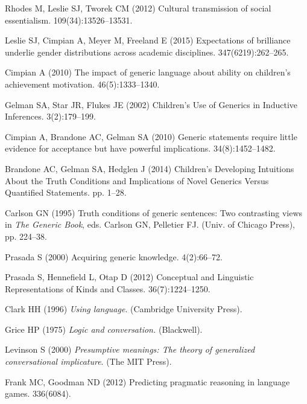 \documentclass{pnastwo}
\begin{document}
\begin{article}
\begin{thebibliography}{10}
Rhodes M, Leslie SJ, Tworek CM (2012) {Cultural transmission of social
  essentialism}.
  109(34):13526--13531.

Leslie SJ, Cimpian A, Meyer M, Freeland E (2015) {Expectations of brilliance
  underlie gender distributions across academic disciplines}.
 347(6219):262--265.

Cimpian A (2010) {The impact of generic language about ability on children's
  achievement motivation.}
 46(5):1333--1340.

Gelman SA, Star JR, Flukes JE (2002) {Children's Use of Generics in Inductive
  Inferences}.
 3(2):179--199.

Cimpian A, Brandone AC, Gelman SA (2010) {Generic statements require little
  evidence for acceptance but have powerful implications.}
 34(8):1452--1482.

Brandone AC, Gelman SA, Hedglen J (2014) {Children's Developing Intuitions
  About the Truth Conditions and Implications of Novel Generics Versus
  Quantified Statements.}
 pp. 1--28.

Carlson GN (1995) Truth conditions of generic sentences: Two contrasting views
  in {\em The Generic Book}, eds.{} Carlson GN, Pelletier FJ.
\newblock (Univ. of Chicago Press), pp. 224--38.

Prasada S (2000) {Acquiring generic knowledge}.
 4(2):66--72.

Prasada S, Hennefield L, Otap D (2012) {Conceptual and Linguistic
  Representations of Kinds and Classes}.
 36(7):1224--1250.

Clark HH (1996) {\em Using language}.
\newblock (Cambridge University Press).

Grice HP (1975) {\em Logic and conversation.}
\newblock (Blackwell).

Levinson S (2000) {\em Presumptive meanings: The theory of generalized
  conversational implicature}.
\newblock (The MIT Press).

Frank MC, Goodman ND (2012) Predicting pragmatic reasoning in language games.
 336(6084).


\end{thebibliography}
\end{article}
\end{document}

